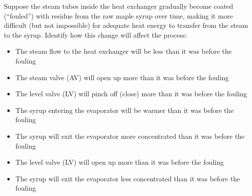 Suppose the steam tubes inside the heat exchanger gradually become coated (``fouled'') with residue from the raw maple syrup over time, making it more difficult (but not impossible) for adequate heat energy to transfer from the steam to the syrup.  Identify how this change will affect the process:

\begin{itemize}
\item{} The steam flow to the heat exchanger will be less than it was before the fouling
\vskip 5pt 
\item{} The steam valve (AV) will open up more than it was before the fouling
\vskip 5pt 
\item{} The level valve (LV) will pinch off (close) more than it was before the fouling 
\vskip 5pt 
\item{} The syrup entering the evaporator will be warmer than it was before the fouling
\vskip 5pt 
\item{} The syrup will exit the evaporator more concentrated than it was before the fouling
\vskip 5pt 
\item{} The level valve (LV) will open up more than it was before the fouling
\vskip 5pt 
\item{} The syrup will exit the evaporator less concentrated than it was before the fouling 
\end{itemize}




